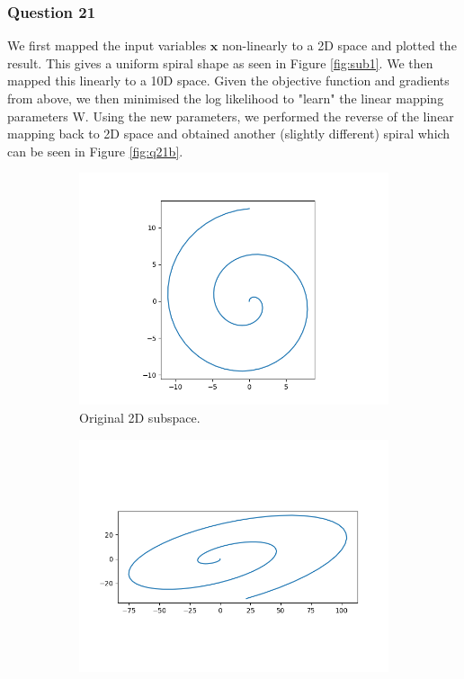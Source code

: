 \documentclass[10pt, a4paper, twocolumn]{article} %
\begin{document}
\subsubsection*{Question 21}

We first mapped the input variables $\mathbf{x}$ non-linearly to a 2D space and plotted the result. This gives a uniform spiral shape as seen in Figure \ref{fig:sub1}. We then mapped this linearly to a 10D space. Given the objective function and gradients from above, we then minimised the log likelihood to "learn" the linear mapping parameters W. Using the new parameters, we performed the reverse of the linear mapping back to 2D space and obtained another (slightly different) spiral which can be seen in Figure \ref{fig:q21b}.

\begin{figure}[!htb]
\centering
\begin{subfigure}{.5\linewidth}
  \centering
  \includegraphics[width=.9\linewidth]{q21_a.png}
  \caption{Original 2D subspace.}
  \label{fig:q21a}
\end{subfigure}%
\begin{subfigure}{.5\linewidth}
  \centering
  \includegraphics[width=.9\linewidth]{q21_b.png}

\end{subfigure}
\end{figure}
\end{document}
